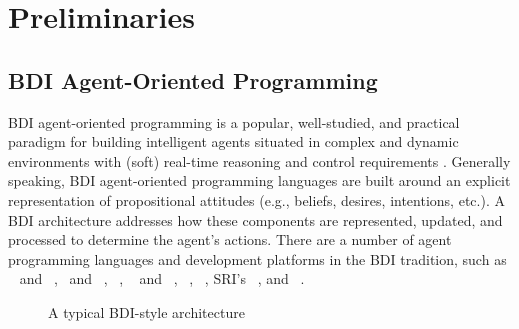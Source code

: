 \section{Preliminaries}\label{sec:preliminaries}

\subsection{BDI Agent-Oriented Programming}\label{sec:bdi_programming}

BDI agent-oriented programming is a popular, well-studied, and practical paradigm
for building intelligent agents situated in complex and dynamic environments with
(soft) real-time reasoning and control requirements
\cite{Georgeff89-PRS,Benfield:AAMAS06}.
Generally speaking, BDI agent-oriented programming languages are built around an
explicit representation of propositional attitudes (e.g., beliefs, desires,
intentions, etc.). A BDI architecture addresses how these components are
represented, updated, and processed to determine the agent's actions.
There are a number of agent programming languages and development platforms in
the BDI tradition, such as \PRS~\cite{IngrandGR:IEEE92-PRS} and
\dMARS~\cite{Inverno:JAAMAS04-dMARS}, \AgentSpeak\ and
\JASON~\cite{Rao:LNCS96-AgentSpeak,Bordini:07-JASONBOOK},
\JADEX~\cite{PokahrBL:EXP03-JADEX},
\TAPL~\cite{Hindriks:JAAMAS99-3APL,DastaniRM:05} and
\DAPL~\cite{Dastani:JAAMAS08-2APL}, \GOAL~\cite{BoerHHM:JAPL07-GOAL},
\JACK~\cite{BusettaRHL:AL99-JACK}, SRI's \SPARK~\cite{MorelyM:AAMAS04-SPARK}, and
\JAM~\cite{Huber:AGENTS99-JAM}.



\begin{figure}[t]
\begin{center}
\resizebox{.9\textwidth}{!}{}
\end{center}
\caption{A typical BDI-style architecture}
\label{fig:bdiarch}
\end{figure}

